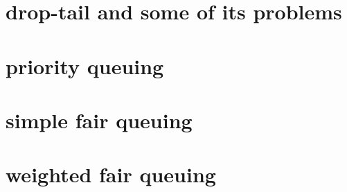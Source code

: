 \section{drop-tail and some of its problems}



\section{priority queuing}



\section{simple fair queuing}

\section{weighted fair queuing}


